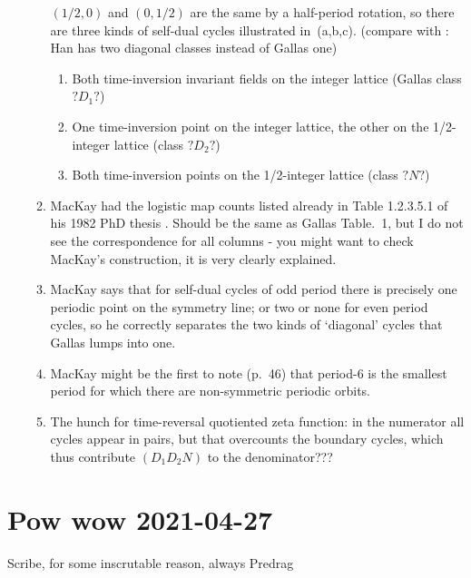 \begin{enumerate}
\begin{enumerate}
$({1}/{2},0)$ and $(0,{1}/{2})$ are the same
by a half-period rotation, so there are three kinds of self-dual cycles
illustrated in \,(a,b,c).
(compare with : Han has two diagonal classes
instead of Gallas one)
\begin{enumerate}
  \item
Both time-inversion invariant fields on the integer lattice
(Gallas class $?D_1?$)
  \item
One time-inversion point on the integer lattice, the other
on the 1/2-integer lattice  (class $?D_2?$)
  \item
Both time-inversion points on the 1/2-integer lattice 
(class $?N?$)
\end{enumerate}
    \item
MacKay had the logistic map counts listed already in Table 1.2.3.5.1 of
his 1982 PhD thesis . Should be the same
as Gallas Table.~1, but I do not see the correspondence for all columns
- you might want
to check MacKay's construction, it is very clearly explained.
    \item
MacKay says that for self-dual cycles of odd period
there is precisely one periodic point on the symmetry line; or two or
none for even period cycles, so he correctly separates the two kinds
of `diagonal' cycles that Gallas lumps into one.
    \item                           \toCB
MacKay might be the first to note (p.~46) that period-6  is the smallest
period for which there are non-symmetric periodic orbits.
    \item
The  hunch for time-reversal quotiented zeta function:
in the numerator all cycles appear in pairs, but that overcounts the boundary cycles,
which thus contribute $(D_1D_2N)$ to the denominator???
\end{enumerate}


\end{enumerate}

\section{Pow wow 2021-04-27}
\label{sect:pw2021-04-27}

Scribe, for some inscrutable reason, always Predrag
\medskip
\begin{description}
\end{description}

